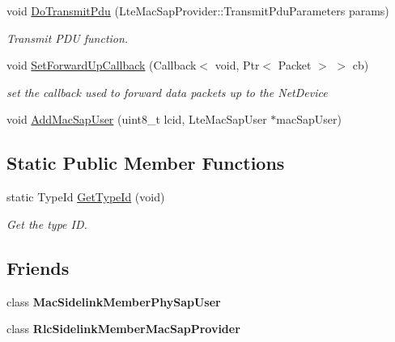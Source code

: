 \begin{DoxyCompactItemize}
\mbox{\label{classns3_1_1millicar_1_1MmWaveSidelinkMac_a36bc120898406b4fa124ec340266e30a}} 
void \hyperlink{classns3_1_1millicar_1_1MmWaveSidelinkMac_a36bc120898406b4fa124ec340266e30a}{Do\+Transmit\+Pdu} (Lte\+Mac\+Sap\+Provider\+::\+Transmit\+Pdu\+Parameters params)
\begin{DoxyCompactList}\small\item\em Transmit P\+DU function. \end{DoxyCompactList}\item 
void \hyperlink{classns3_1_1millicar_1_1MmWaveSidelinkMac_af303cc45866c7094f9f2c36bbaa0a66c}{Set\+Forward\+Up\+Callback} (Callback$<$ void, Ptr$<$ Packet $>$ $>$ cb)
\begin{DoxyCompactList}\small\item\em set the callback used to forward data packets up to the Net\+Device \end{DoxyCompactList}\item 
void \hyperlink{classns3_1_1millicar_1_1MmWaveSidelinkMac_ad4c32a42bd58226a3ad07828e7b4cff0}{Add\+Mac\+Sap\+User} (uint8\+\_\+t lcid, Lte\+Mac\+Sap\+User $\ast$mac\+Sap\+User)
\end{DoxyCompactItemize}
\subsection*{Static Public Member Functions}
\begin{DoxyCompactItemize}
\item 
static Type\+Id \hyperlink{classns3_1_1millicar_1_1MmWaveSidelinkMac_a97fdea26e60baec2ab5f082da054e18e}{Get\+Type\+Id} (void)
\begin{DoxyCompactList}\small\item\em Get the type ID. \end{DoxyCompactList}\end{DoxyCompactItemize}
\subsection*{Friends}
\begin{DoxyCompactItemize}
\item 
\mbox{\label{classns3_1_1millicar_1_1MmWaveSidelinkMac_a7718a67d36cf06d1d96b26fbea6910eb}} 
class {\bfseries Mac\+Sidelink\+Member\+Phy\+Sap\+User}
\item 
\mbox{\label{classns3_1_1millicar_1_1MmWaveSidelinkMac_a60d31e68fce742d4da754d8f69824337}} 
class {\bfseries Rlc\+Sidelink\+Member\+Mac\+Sap\+Provider}
\end{DoxyCompactItemize}


